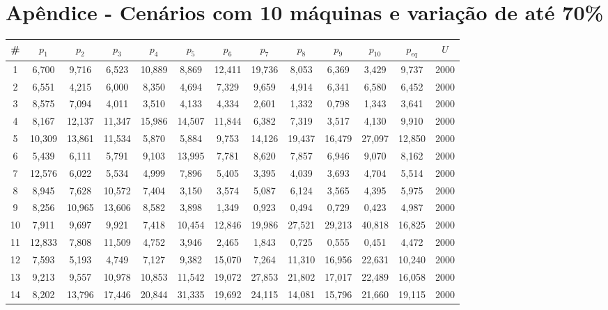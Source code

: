 \newpage
\section{Apêndice - Cenários com 10 máquinas e variação de até 70\%}\label{app:tab10machine70}
{\footnotesize\tabcolsep=3pt %
\begin{longtable}{ >{\footnotesize}ccccccccccccc}
\hline
\#  & $p_1$     & $p_2$     & $p_3$     & $p_4$     & $p_5$     & $p_6$     & $p_7$     & $p_8$     & $p_9$     & $p_{10}$    & $p_{eq}$    & $U$    \\ \hline
1   & 6,700  & 9,716  & 6,523  & 10,889 & 8,869  & 12,411 & 19,736 & 8,053  & 6,369  & 3,429  & 9,737  & 2000 \\
2   & 6,551  & 4,215  & 6,000  & 8,350  & 4,694  & 7,329  & 9,659  & 4,914  & 6,341  & 6,580  & 6,452  & 2000 \\
3   & 8,575  & 7,094  & 4,011  & 3,510  & 4,133  & 4,334  & 2,601  & 1,332  & 0,798  & 1,343  & 3,641  & 2000 \\
4   & 8,167  & 12,137 & 11,347 & 15,986 & 14,507 & 11,844 & 6,382  & 7,319  & 3,517  & 4,130  & 9,910  & 2000 \\
5   & 10,309 & 13,861 & 11,534 & 5,870  & 5,884  & 9,753  & 14,126 & 19,437 & 16,479 & 27,097 & 12,850 & 2000 \\
6   & 5,439  & 6,111  & 5,791  & 9,103  & 13,995 & 7,781  & 8,620  & 7,857  & 6,946  & 9,070  & 8,162  & 2000 \\
7   & 12,576 & 6,022  & 5,534  & 4,999  & 7,896  & 5,405  & 3,395  & 4,039  & 3,693  & 4,704  & 5,514  & 2000 \\
8   & 8,945  & 7,628  & 10,572 & 7,404  & 3,150  & 3,574  & 5,087  & 6,124  & 3,565  & 4,395  & 5,975  & 2000 \\
9   & 8,256  & 10,965 & 13,606 & 8,582  & 3,898  & 1,349  & 0,923  & 0,494  & 0,729  & 0,423  & 4,987  & 2000 \\
10  & 7,911  & 9,697  & 9,921  & 7,418  & 10,454 & 12,846 & 19,986 & 27,521 & 29,213 & 40,818 & 16,825 & 2000 \\
11  & 12,833 & 7,808  & 11,509 & 4,752  & 3,946  & 2,465  & 1,843  & 0,725  & 0,555  & 0,451  & 4,472  & 2000 \\
12  & 7,593  & 5,193  & 4,749  & 7,127  & 9,382  & 15,070 & 7,264  & 11,310 & 16,956 & 22,631 & 10,240 & 2000 \\
13  & 9,213  & 9,557  & 10,978 & 10,853 & 11,542 & 19,072 & 27,853 & 21,802 & 17,017 & 22,489 & 16,058 & 2000 \\
14  & 8,202  & 13,796 & 17,446 & 20,844 & 31,335 & 19,692 & 24,115 & 14,081 & 15,796 & 21,660 & 19,115 & 2000 \\

\end{longtable}}
